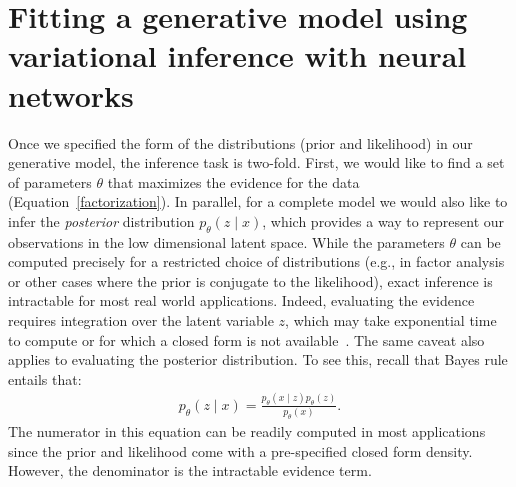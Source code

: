 \section{Fitting a generative model using variational inference with neural networks}
\label{subsec:VI_deep}
Once we specified the form of the distributions (prior and likelihood) in our generative model, the inference task is two-fold. First, we would like to find a set of parameters $\theta$ that maximizes the evidence for the data (Equation~\eqref{factorization}). In parallel, for a complete model we would also like to infer the \textit{posterior} distribution $p_\theta(z \mid x)$, which provides a way to represent our observations in the low dimensional latent space. While the parameters $\theta$ can be computed precisely for a restricted choice of distributions (e.g., in factor analysis~\cite{Jolliffe1986} or other cases where the prior is conjugate to the likelihood), exact inference is intractable for most real world applications. Indeed, evaluating the evidence requires integration over the latent variable $z$, which may take exponential time to compute or for which a closed form is not available~\cite{jordan1999introduction}. The same caveat also applies to evaluating the posterior distribution. To see this, recall that Bayes rule entails that:
\begin{align}
\label{eq:Bayesrule}
     p_\theta(z \mid x) = \frac{p_\theta(x \mid z)p_\theta(z)}{p_\theta(x)}.
\end{align}
The numerator in this equation can be readily computed in most applications since the prior and likelihood come with a pre-specified closed form density. However, the denominator is the intractable evidence term.


